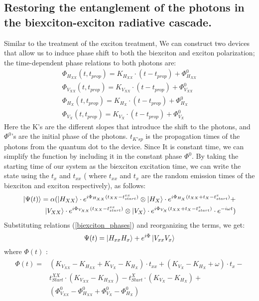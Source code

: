 \subsection*{Restoring the entanglement of the photons in the biexciton-exciton radiative cascade.}
Similar to the treatment of the exciton treatment, We can construct two devices that allow us to induce phase shift to both the biexciton and exciton polarization; the time-dependent phase relations to both photons are: 
\begin{equation} \label{biexciton_phases}
	\begin{aligned} 
		&\Phi_{H_{XX}}{(t,t_{prop})} = K_{H_{XX}}\cdot(t-t_{prop}) + \Phi^0_{H_{XX}} & \\	&\Phi_{V_{XX}}{(t,t_{prop})} = K_{V_{XX}}\cdot(t-t_{prop}) + \Phi^0_{V_{XX}} \\
		&\Phi_{H_{X}}{(t,t_{prop})} = K_{H_{X}}\cdot(t-t_{prop}) + \Phi^0_{H_{X}} &\\
		&\Phi_{V_{X}}{(t,t_{prop})} = K_{V_{X}}\cdot(t-t_{prop}) + \Phi^0_{V_{X}} 
	\end{aligned}
\end{equation}
Here the K's are the different slopes that introduce the shift to the photons, and $\Phi^0$'s are the initial phase of the photons. $t_{K'sp}$ is the propagation times of the photons from the quantum dot to the device. Since It is constant time, we can simplify the function by including it in the constant phase $\Phi^0$.
By taking the starting time of our system as the biexciton excitation time, we can write the state using the $t_x$ and $t_{xx}$ ( where $t_{xx}$ and $t_{x}$ are the random emission times of the biexciton and exciton respectively), as follows:
\begin{equation}
	\begin{split}
		\ket{\Psi(t)}= \alpha(\ket{H_{XX}}\cdot e^{i\Phi_{H_{XX}}(t_{XX}-t^{xx}_{start})} \otimes 
		\ket{H_{X}}\cdot e^{i\Phi_{H_{X}}(t_{XX}+t_{X}-t^{x}_{start})}+\\
		\ket{V_{XX}}\cdot e^{i\Phi_{V_{XX}}(t_{XX}-t^{xx}_{start})} \otimes 
		\ket{V_{X}}\cdot e^{i\Phi_{V_{X}}(t_{XX}+t_{X}-t^{x}_{start})}\cdot e^{-i\omega t})	
	\end{split}
\end{equation} 
Substituting relations (\ref{biexciton_phases}) and reorganizing the terms, we get:
\begin{equation}
	\Psi(t) = \ket{H_{xx}H_x}+e^{i\Phi}\ket{V_{xx}V_x}
\end{equation}
where $\Phi(t)$ :
\begin{equation}
	\begin{split}  
		\begin{aligned} 
			\Phi(t) = &(K_{V_{XX}}-K_{H_{XX}}+K_{V_X} - K_{H_X})\cdot t_{xx}+(K_{V_X}-K_{H_X} + \omega)\cdot t_x -\\
			&t^{XX}_{Start} \cdot(K_{V_{XX}} - K_{H_{XX}})-t^X_{Start} \cdot(K_{V_X}-K_{H_X})+\\
			&(\Phi^0_{V_{XX}}-\Phi^0_{H_{XX}}+\Phi^0_{V_{X}}-\Phi^0_{H_{X}})
		\end{aligned}
	\end{split}
\end{equation}
